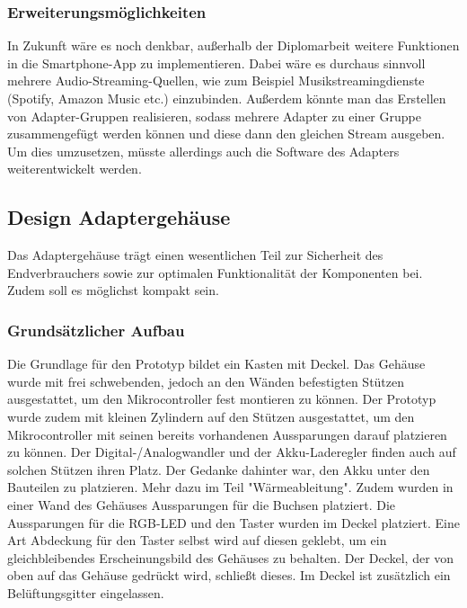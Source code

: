 \documentclass[11pt, twoside]{article}
\begin{document}
\subsubsection{Erweiterungsmöglichkeiten}
In Zukunft wäre es noch denkbar, außerhalb der Diplomarbeit weitere Funktionen in die Smartphone-App zu implementieren. Dabei wäre es durchaus sinnvoll mehrere Audio-Streaming-Quellen, wie zum Beispiel Musikstreamingdienste (Spotify, Amazon Music etc.) einzubinden. Außerdem könnte man das Erstellen von Adapter-Gruppen realisieren, sodass mehrere Adapter zu einer Gruppe zusammengefügt werden können und diese dann den gleichen Stream ausgeben. Um dies umzusetzen, müsste allerdings auch die Software des Adapters weiterentwickelt werden.
\subsection{Design Adaptergehäuse}
Das Adaptergehäuse trägt einen wesentlichen Teil zur Sicherheit des Endverbrauchers sowie zur optimalen
Funktionalität der Komponenten bei. Zudem soll es möglichst kompakt sein.
\subsubsection{Grundsätzlicher Aufbau}
Die Grundlage für den Prototyp bildet ein Kasten mit Deckel.\newline
Das Gehäuse wurde mit frei schwebenden, jedoch an den Wänden befestigten Stützen ausgestattet, um den Mikrocontroller fest montieren zu können. Der Prototyp wurde zudem mit kleinen Zylindern auf den Stützen ausgestattet, um den Mikrocontroller mit seinen bereits vorhandenen Aussparungen darauf platzieren zu können. Der Digital-/Analogwandler und der Akku-Laderegler finden auch auf solchen Stützen ihren Platz. Der Gedanke dahinter war, den Akku unter den Bauteilen zu platzieren. Mehr dazu im Teil "Wärmeableitung". Zudem wurden in einer Wand des Gehäuses Aussparungen für die Buchsen platziert. Die Aussparungen für die RGB-LED und den Taster wurden im Deckel platziert. Eine Art Abdeckung für den Taster selbst wird auf diesen geklebt, um ein gleichbleibendes Erscheinungsbild des Gehäuses zu behalten. Der Deckel, der von oben auf das Gehäuse gedrückt wird, schließt dieses. Im Deckel ist zusätzlich ein Belüftungsgitter eingelassen.
\end{document}
